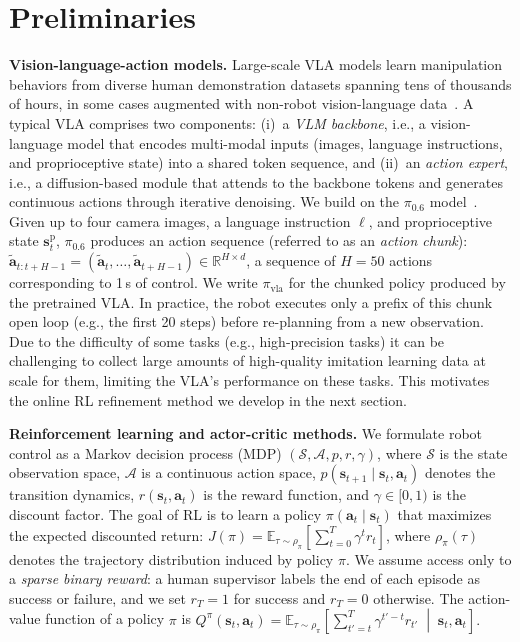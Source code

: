 \section{Preliminaries}
\label{sec:preliminaries}

\textbf{Vision-language-action models.}
Large-scale VLA models learn manipulation behaviors from diverse human demonstration datasets spanning tens of thousands of hours, in some cases augmented with non-robot vision-language data~\citep{pi05,geminirobotics,kim2024openvla}. A typical VLA comprises two components: (i)~a \emph{VLM backbone}, i.e., a vision-language model that encodes multi-modal inputs (images, language instructions, and proprioceptive state) into a shared token sequence, and (ii)~an \emph{action expert}, i.e., a diffusion-based module that attends to the backbone tokens and generates continuous actions through iterative denoising. We build on the $\pi_{0.6}$ model~\cite{pi06_model_card}. Given up to four camera images, a language instruction $\ell$, and proprioceptive state $\mathbf{s}^{\text{p}}_t$, $\pi_{0.6}$ produces an action sequence (referred to as an \emph{action chunk}): $\tilde{\mathbf{a}}_{t:t+H-1} = (\tilde{\mathbf{a}}_t, \ldots, \tilde{\mathbf{a}}_{t+H-1}) \in \mathbb{R}^{H \times d}$, a sequence of $H=50$ actions corresponding to 1\,s of control. We write $\pi_{\text{vla}}$ for the chunked policy produced by the pretrained VLA. In practice, the robot executes only a prefix of this chunk open loop (e.g., the first 20 steps) before re-planning from a new observation.
Due to the difficulty of some tasks (e.g., high-precision tasks) it can be challenging to collect large amounts of high-quality imitation learning data at scale for them, limiting the VLA's performance on these tasks. This motivates the online RL refinement method we develop in the next section. 

\textbf{Reinforcement learning and actor-critic methods.}
We formulate robot control as a Markov decision process (MDP) $(\mathcal{S}, \mathcal{A}, p, r, \gamma)$, where $\mathcal{S}$ is the state observation space, $\mathcal{A}$ is a continuous action space, $p(\mathbf{s}_{t+1} \mid \mathbf{s}_t, \mathbf{a}_t)$ denotes the transition dynamics, $r(\mathbf{s}_t, \mathbf{a}_t)$ is the reward function, and $\gamma \in [0,1)$ is the discount factor. The goal of RL is to learn a policy $\pi(\mathbf{a}_t \mid \mathbf{s}_t)$ that maximizes the expected discounted return:
$J(\pi) = \mathbb{E}_{\tau \sim \rho_\pi}\left[\sum_{t=0}^{T} \gamma^t r_t\right]$,
where $\rho_\pi(\tau)$ denotes the trajectory distribution induced by policy $\pi$. We assume access only to a \emph{sparse binary reward}: a human supervisor labels the end of each episode as success or failure, and we set $r_T = 1$ for success and $r_T = 0$ otherwise. The action-value function of a policy $\pi$ is
$
Q^\pi(\mathbf{s}_t, \mathbf{a}_t)=
\mathbb{E}_{\tau \sim \rho_\pi}
\left[
\sum_{t'=t}^{T} \gamma^{t'-t} r_{t'}
\;\middle|\;
\mathbf{s}_t, \mathbf{a}_t
\right].
$

